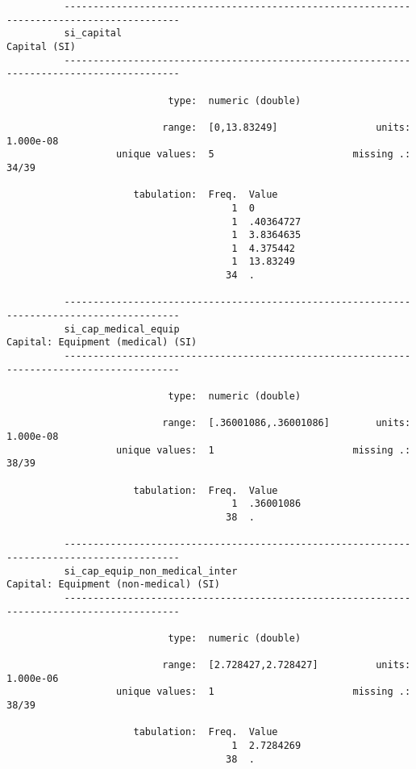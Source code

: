 \documentclass{article}
\begin{document}
\begin{verbatim}
          ------------------------------------------------------------------------------------------
          si_capital                                                                    Capital (SI)
          ------------------------------------------------------------------------------------------
          
                            type:  numeric (double)
          
                           range:  [0,13.83249]                 units:  1.000e-08
                   unique values:  5                        missing .:  34/39
          
                      tabulation:  Freq.  Value
                                       1  0
                                       1  .40364727
                                       1  3.8364635
                                       1  4.375442
                                       1  13.83249
                                      34  .
          
          ------------------------------------------------------------------------------------------
          si_cap_medical_equip                                     Capital: Equipment (medical) (SI)
          ------------------------------------------------------------------------------------------
          
                            type:  numeric (double)
          
                           range:  [.36001086,.36001086]        units:  1.000e-08
                   unique values:  1                        missing .:  38/39
          
                      tabulation:  Freq.  Value
                                       1  .36001086
                                      38  .
          
          ------------------------------------------------------------------------------------------
          si_cap_equip_non_medical_inter                       Capital: Equipment (non-medical) (SI)
          ------------------------------------------------------------------------------------------
          
                            type:  numeric (double)
          
                           range:  [2.728427,2.728427]          units:  1.000e-06
                   unique values:  1                        missing .:  38/39
          
                      tabulation:  Freq.  Value
                                       1  2.7284269
                                      38  .
          

\end{verbatim}
\end{document}
